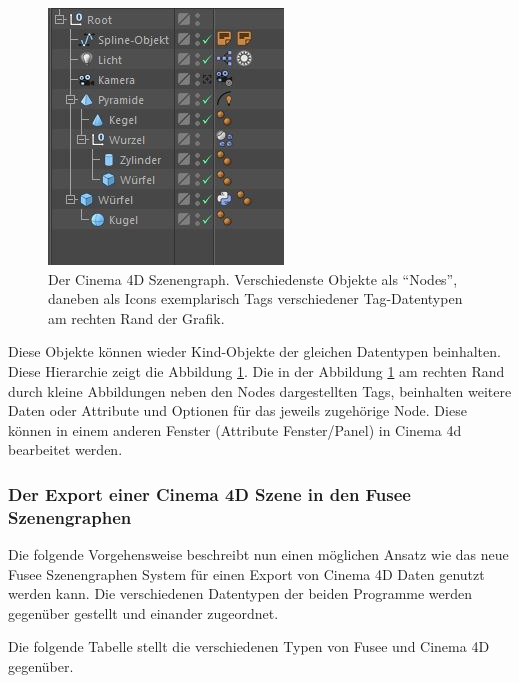 \documentclass[pagesize, paper=a4, fontsize=12pt, titlepage=true, headings=small, headnosepline, abstractoff, liststotoc, nochapterprefix, plainheadsepline, twoside]{scrreprt}
\begin{document}
\begin{figure}[ht]
	\centering
	\includegraphics{Bilder/c4d_Szenengraph_Vgl.jpg}
	\caption{Der Cinema 4D Szenengraph. Verschiedenste Objekte als “Nodes”, daneben als Icons exemplarisch Tags verschiedener Tag-Datentypen am rechten Rand der Grafik.}
	\label{Cinema 4DSzenenGraph}
\end{figure}

Diese Objekte können wieder Kind-Objekte der gleichen Datentypen beinhalten. Diese Hierarchie zeigt die Abbildung \ref{Cinema 4DSzenenGraph}. Die in der Abbildung \ref{Cinema 4DSzenenGraph} am rechten Rand durch kleine Abbildungen neben den Nodes dargestellten Tags, beinhalten weitere Daten oder Attribute und Optionen für das jeweils zugehörige Node. Diese können in einem anderen Fenster (Attribute Fenster/Panel) in Cinema 4d bearbeitet werden.

\subsubsection{Der Export einer Cinema 4D Szene in den Fusee Szenengraphen}
Die folgende Vorgehensweise beschreibt nun einen möglichen Ansatz wie das neue Fusee Szenengraphen System für einen Export von Cinema 4D Daten genutzt werden kann. Die verschiedenen Datentypen der beiden Programme werden gegenüber gestellt und einander zugeordnet.

Die folgende Tabelle stellt die verschiedenen Typen von Fusee und Cinema 4D gegenüber.
\end{document}
